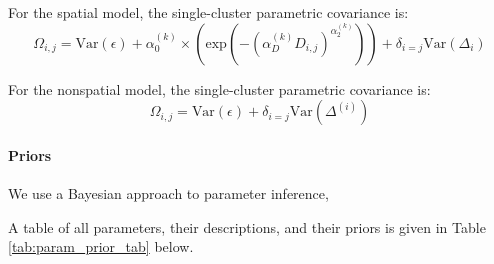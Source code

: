 \documentclass[12pt]{article}
\begin{document}
For the spatial model, the single-cluster parametric covariance is:
\begin{equation}
\Omega_{i,j} = \text{Var}(\epsilon) + 
\alpha^{(k)}_0 \times \left(\text{exp} \left(  -(\alpha^{(k)}_D D_{i,j})^{\alpha^{(k)}_2}\right) \right)	 +
\delta_{i=j} \text{Var}(\Delta_i)
\label{admixed_spatial_cov}
\end{equation}

For the nonspatial model, the single-cluster parametric covariance is:
\begin{equation}
\Omega_{i,j} = \text{Var}(\epsilon) + \delta_{i=j} \text{Var}(\Delta^{(i)})
\label{admixed_discrete_covariance}
\end{equation}

\paragraph{Priors}
We use a Bayesian approach to parameter inference, 

A table of all parameters, their descriptions, and their priors is given in Table \ref{tab:param_prior_tab} below.
\end{document}
